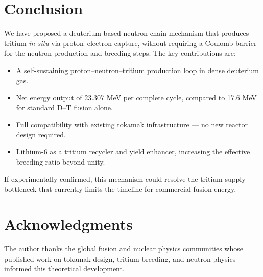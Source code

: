 \documentclass[12pt,a4paper]{article}
\begin{document}
\section{Conclusion}

We have proposed a deuterium-based neutron chain mechanism that
produces tritium \emph{in situ} via proton--electron capture,
without requiring a Coulomb barrier for the neutron production
and breeding steps. The key contributions are:

\begin{itemize}
  \item A self-sustaining proton--neutron--tritium production loop
    in dense deuterium gas.
  \item Net energy output of 23.307 MeV per complete cycle,
    compared to 17.6 MeV for standard D--T fusion alone.
  \item Full compatibility with existing tokamak infrastructure
    — no new reactor design required.
  \item Lithium-6 as a tritium recycler and yield enhancer,
    increasing the effective breeding ratio beyond unity.
\end{itemize}

If experimentally confirmed, this mechanism could resolve the
tritium supply bottleneck that currently limits the timeline
for commercial fusion energy.

\section*{Acknowledgments}

The author thanks the global fusion and nuclear physics communities
whose published work on tokamak design, tritium breeding, and
neutron physics informed this theoretical development.
\end{document}
